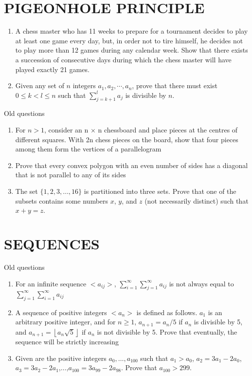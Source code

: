 \documentclass[12pt]{article}
\newcommand{\floor}[1]{\left\lfloor #1 \right\rfloor}
\begin{document}
\section{PIGEONHOLE PRINCIPLE}
\begin{enumerate}
    \item A chess master who has 11 weeks to prepare for a tournament decides to play at least one game every day, but, in order not to tire himself, he decides not to play more than 12 games during any calendar week. Show that there exists a succession of consecutive days during which the chess master will have played exactly 21 games.
    \item Given any set of $n$ integers $a_1, a_2, \cdots, a_n$, prove that there must exist $0 \leq k < l \leq n$ such that $\sum_{j=k+1}^{l}a_j$ is divisible by $n$.

\end{enumerate}
Old questions
\begin{enumerate}
    \item For $n>1$, consider an n × n chessboard and place pieces at the centres of different squares. With 2n chess pieces on the board, show that four pieces among them form the vertices of a parallelogram
    \item Prove that every convex polygon with an even number of sides has a diagonal that is not parallel to any of its sides
    \item The set $\{1,2,3,\dots,16\}$ is partitioned into three sets. Prove that one of the subsets contains some numbers $x$, $y$, and $z$ (not necessarily distinct) such that $x+y=z$.
\end{enumerate}

\section{SEQUENCES}
Old questions
\begin{enumerate}
    \item For an infinite sequence $<a_{ij}>$, $\displaystyle\sum_{i=1}^{\infty}\sum_{j=1}^{\infty} a_{ij}$ is not always equal to $\displaystyle\sum_{j=1}^{\infty}\sum_{i=1}^{\infty} a_{ij}$
    \item A sequence of positive integers $<a_{n}>$ is defined as follows. $a_{1}$ is an arbitrary positive integer, and for $n \ge 1$, $a_{n+1}=a_{n}/5$ if $a_{n}$ is divisible by 5, and $a_{n+1} = \floor{a_{n}\sqrt{5}}$ if $a_{n}$ is not divisible by 5. Prove that eventually, the sequence will be strictly increasing
    \item Given are the positive integers $a_{0},\dots,a_{100}$ such that $a_{1} > a_{0}$, $a_{2} = 3a_{1} - 2a_{0}$, $a_{3} = 3a_{2} - 2a_{1}$,$\dots$,$a_{100} = 3a_{99} - 2a_{98}$. Prove that $a_{100} > 299$.

\end{enumerate}
\end{document}
